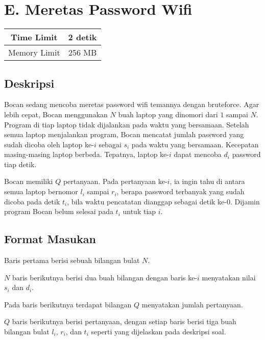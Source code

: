\documentclass{article}
\begin{document}
\section*{\hfil E. Meretas Password Wifi\hfil}

\begin{center}
\begin{tabular}{ |cc| } 
 \hline
 Time Limit & 2 detik \\
 \hline 
 Memory Limit & 256 MB \\
 \hline
\end{tabular}
\end{center}

\subsection*{Deskripsi}

\par\noindent Bocan sedang mencoba meretas password wifi temannya dengan bruteforce. Agar lebih cepat, Bocan menggunakan $N$ buah laptop yang dinomori dari $1$ sampai $N$. Program di tiap laptop tidak dijalankan pada waktu yang bersamaan. Setelah semua laptop menjalankan program, Bocan mencatat jumlah password yang sudah dicoba oleh laptop ke-$i$ sebagai $s_i$ pada waktu yang bersamaan. Kecepatan masing-masing laptop berbeda. Tepatnya, laptop ke-$i$ dapat mencoba $d_i$ password tiap detik.

\par\noindent Bocan memiliki $Q$ pertanyaan. Pada pertanyaan ke-$i$, ia ingin tahu di antara semua laptop bernomor $l_i$ sampai $r_i$, berapa password terbanyak yang sudah dicoba pada detik $t_i$, bila waktu pencatatan dianggap sebagai detik ke-$0$. Dijamin program Bocan belum selesai pada $t_i$ untuk tiap $i$.

\subsection*{Format Masukan}

\par\noindent Baris pertama berisi sebuah bilangan bulat $N$.
\par\noindent $N$ baris berikutnya berisi dua buah bilangan dengan baris ke-$i$ menyatakan nilai $s_i$ dan $d_i$.
\par\noindent Pada baris berikutnya terdapat bilangan $Q$ menyatakan jumlah pertanyaan.
\par\noindent $Q$ baris berikutnya berisi pertanyaan, dengan setiap baris berisi tiga buah bilangan bulat $l_i$, $r_i$, dan $t_i$ seperti yang dijelaskan pada deskripsi soal.
\end{document}
